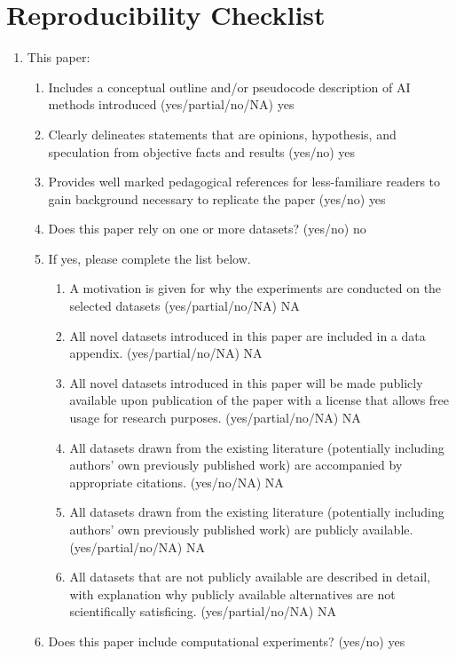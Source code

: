 \section{Reproducibility Checklist}
\begin{enumerate}
    \item This paper:
    \begin{enumerate}
        \item Includes a conceptual outline and/or pseudocode description of AI methods introduced (yes/partial/no/NA) {\color{red} yes}
        \item Clearly delineates statements that are opinions, hypothesis, and speculation from objective facts and results (yes/no) {\color{red} yes}
        \item Provides well marked pedagogical references for less-familiare readers to gain background necessary to replicate the paper (yes/no) {\color{red} yes}
        \item Does this paper rely on one or more datasets? (yes/no) {\color{red} no} 
        \item If yes, please complete the list below.
        \begin{enumerate}
            \item A motivation is given for why the experiments are conducted on the selected datasets (yes/partial/no/NA) {\color{red} NA}
            \item All novel datasets introduced in this paper are included in a data appendix. (yes/partial/no/NA) {\color{red} NA}
            \item All novel datasets introduced in this paper will be made publicly available upon publication of the paper with a license that allows free usage for research purposes. (yes/partial/no/NA) {\color{red} NA}
            \item All datasets drawn from the existing literature (potentially including authors’ own previously published work) are accompanied by appropriate citations. (yes/no/NA) {\color{red} NA}
            \item All datasets drawn from the existing literature (potentially including authors’ own previously published work) are publicly available. (yes/partial/no/NA) {\color{red} NA}
            \item All datasets that are not publicly available are described in detail, with explanation why publicly available alternatives are not scientifically satisficing. (yes/partial/no/NA) {\color{red} NA}
        \end{enumerate}
        \item Does this paper include computational experiments? (yes/no) {\color{red} yes}


\end{enumerate}
\end{enumerate}
